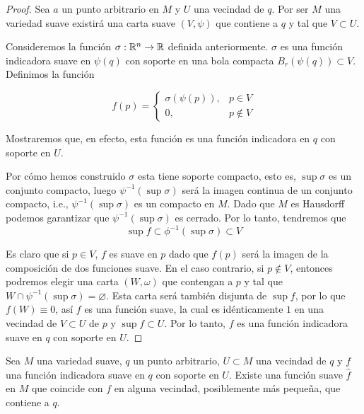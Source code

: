 \begin{proof}
	Sea $a$ un punto arbitrario en $M$ y $U$ una vecindad de $q$. Por ser $M$ una variedad suave existirá una carta suave $(V,\psi)$ que contiene a $q$ y tal que $V \subset U$.

	Consideremos la función $\sigma: \mathbb{R}^n \to \mathbb{R}$ definida anteriormente. $\sigma$ es una función indicadora suave en $\psi(q)$ con soporte en una bola compacta $B_r(\psi(q)) \subset V$. Definimos la función

	\[
		f(p) = \begin{cases}
			\sigma(\psi(p)), & p \in V    \\
			0,               & p \notin V
		\end{cases}
	\]

	Mostraremos que, en efecto, esta función es una función indicadora en $q$ con soporte en $U$.

	Por cómo hemos construido $\sigma$ esta tiene soporte compacto, esto es, $\sup \sigma$ es un conjunto compacto, luego $\psi^{-1}(\sup \sigma)$ será la imagen continua de un conjunto compacto, i.e., $\psi^{-1}(\sup \sigma)$ es un compacto en $M$. Dado que $M$ es Hausdorff podemos garantizar que $\psi^{-1} (\sup \sigma)$ es cerrado. Por lo tanto, tendremos que
	\[
		\sup f \subset \phi^{-1} (\sup \sigma) \subset V
	\]

	Es claro que si $p \in V$, $f$ es suave en $p$ dado que $f(p)$ será la imagen de la composición de dos funciones suave. En el caso contrario, si $p \notin V$, entonces podremos elegir una carta $(W,\omega)$ que contengan a $p$ y tal que $W \cap \psi^{-1}(\sup \sigma) = \varnothing$. Esta carta será también disjunta de $\sup f$, por lo que $f(W) \equiv 0$, así $f$ es una función suave, la cual es idénticamente $1$ en una vecindad de $V \subset U$ de $p$ y $\sup f \subset U$. Por lo tanto, $f$ es una función indicadora suave en $q$ con soporte en $U$.
\end{proof}

\begin{lemma}
	Sea $M$ una variedad suave, $q$ un punto arbitrario, $U \subset M$ una vecindad de $q$ y $f$ una función indicadora suave en $q$ con soporte en $U$. Existe una función suave $\hat{f}$ en $M$ que coincide con $f$ en alguna vecindad, posiblemente más pequeña, que contiene a $q$.
\end{lemma}

